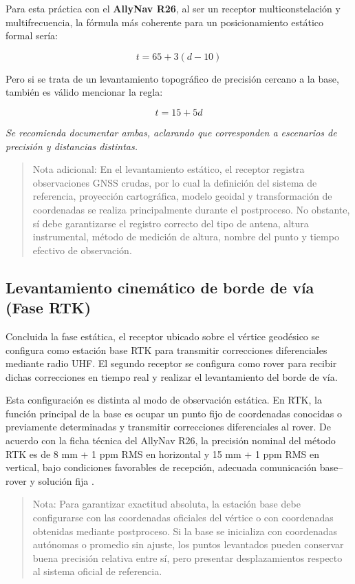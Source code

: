 \documentclass[
  letterpaper,
  DIV=11,
  numbers=noendperiod]{scrartcl}
\begin{document}
Para esta práctica con el \textbf{AllyNav R26}, al ser un receptor
multiconstelación y multifrecuencia, la fórmula más coherente para un
posicionamiento estático formal sería:

\[t = 65 + 3(d - 10)\]

Pero si se trata de un levantamiento topográfico de precisión cercano a
la base, también es válido mencionar la regla:

\[t = 15 + 5d\]

\emph{Se recomienda documentar ambas, aclarando que corresponden a
escenarios de precisión y distancias distintas.}

\begin{quote}
Nota adicional: En el levantamiento estático, el receptor registra
observaciones GNSS crudas, por lo cual la definición del sistema de
referencia, proyección cartográfica, modelo geoidal y transformación de
coordenadas se realiza principalmente durante el postproceso. No
obstante, sí debe garantizarse el registro correcto del tipo de antena,
altura instrumental, método de medición de altura, nombre del punto y
tiempo efectivo de observación.
\end{quote}

\subsection{Levantamiento cinemático de borde de vía (Fase
RTK)}\label{levantamiento-cinemuxe1tico-de-borde-de-vuxeda-fase-rtk}

Concluida la fase estática, el receptor ubicado sobre el vértice
geodésico se configura como estación base RTK para transmitir
correcciones diferenciales mediante radio UHF. El segundo receptor se
configura como rover para recibir dichas correcciones en tiempo real y
realizar el levantamiento del borde de vía.

Esta configuración es distinta al modo de observación estática. En RTK,
la función principal de la base es ocupar un punto fijo de coordenadas
conocidas o previamente determinadas y transmitir correcciones
diferenciales al rover. De acuerdo con la ficha técnica del AllyNav R26,
la precisión nominal del método RTK es de 8 mm + 1 ppm RMS en horizontal
y 15 mm + 1 ppm RMS en vertical, bajo condiciones favorables de
recepción, adecuada comunicación base--rover y solución fija .

\begin{quote}
Nota: Para garantizar exactitud absoluta, la estación base debe
configurarse con las coordenadas oficiales del vértice o con coordenadas
obtenidas mediante postproceso. Si la base se inicializa con coordenadas
autónomas o promedio sin ajuste, los puntos levantados pueden conservar
buena precisión relativa entre sí, pero presentar desplazamientos
respecto al sistema oficial de referencia.
\end{quote}
\end{document}
